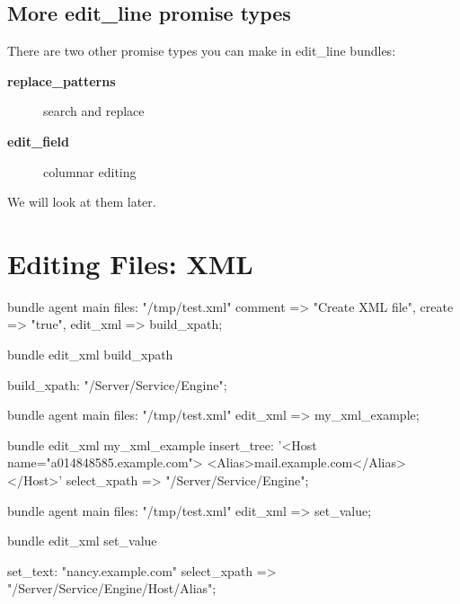 \subsection{More edit\_line promise types}

There are two other promise types you can make in edit\_line bundles:

\begin{description}
\item[\textbf{replace\_patterns}] search and replace



\item[\textbf{edit\_field}] columnar editing
\end{description}

We will look at them later.





\section{Editing Files: XML}

\begin{codelisting}
\begin{code}
bundle agent main
{
  files:
      "/tmp/test.xml"
        comment => "Create XML file",
        create => "true",
        edit_xml => build_xpath;
}

bundle edit_xml build_xpath
{
   build_xpath:
      "/Server/Service/Engine";

}
\end{code}
\end{codelisting}
\begin{codelisting}
\begin{code}
bundle agent main
{
  files:
      "/tmp/test.xml"
        edit_xml => my_xml_example;
}

bundle edit_xml my_xml_example
{
  insert_tree:
      '<Host name="a014848585.example.com">
             <Alias>mail.example.com</Alias>
       </Host>'
        select_xpath => "/Server/Service/Engine";
}

\end{code}
\end{codelisting}
\begin{codelisting}
\begin{code}
bundle agent main
{
  files:
      "/tmp/test.xml"
        edit_xml => set_value;
}

bundle edit_xml set_value
{
  set_text:
      "nancy.example.com"
        select_xpath => "/Server/Service/Engine/Host/Alias";

}
\end{code}
\end{codelisting}





